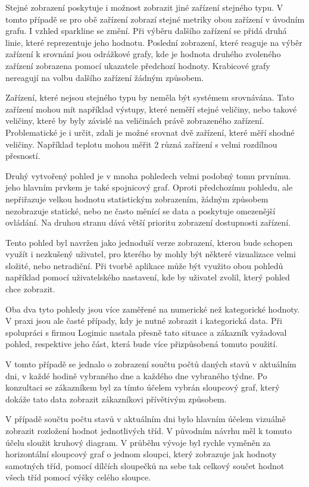 Stejné zobrazení poskytuje i možnost zobrazit jiné zařízení stejného typu. V tomto případě se pro obě zařízení zobrazí stejné metriky obou zařízení v úvodním grafu. I vzhled sparkline se změní. Při výběru dalšího zařízení se přidá druhá linie, které reprezentuje jeho hodnotu. Poslední zobrazení, které reaguje na výběr zařízení k srovnání jsou odrážkové grafy, kde je hodnota druhého zvoleného zařízení zobrazena pomocí ukazatele předchozí hodnoty. Krabicové grafy nereagují na volbu dalšího zařízení žádným způsobem.

Zařízení, které nejsou stejného typu by neměla být systémem srovnávána. Tato zařízení mohou mít například výstupy, které neměří stejné veličiny, nebo takové veličiny, které by byly závislé na veličinách právě zobrazeného zařízení. Problematické je i určit, zdali je možné srovnat dvě zařízení, které měří shodné veličiny. Například teplotu mohou měřit 2 různá zařízení s velmi rozdílnou přesností. 

Druhý vytvořený pohled je v mnoha pohledech velmi podobný tomu prvnímu. jeho hlavním prvkem je také spojnicový graf. Oproti předchozímu pohledu, ale nepřiřazuje velkou hodnotu statistickým zobrazením, žádným způsobem nezobrazuje statické, nebo ne často měnící se data a poskytuje omezenější ovládání. Na druhou stranu dává větší prioritu zobrazení dostupnosti zařízení.

Tento pohled byl navržen jako jednoduší verze zobrazení, kterou bude schopen využít i nezkušený uživatel, pro kterého by mohly být některé vizualizace velmi složité, nebo netradiční. Při tvorbě aplikace může být využito obou pohledů například pomocí uživatelského nastavení, kde by uživatel zvolil, který pohled chce zobrazit.

Oba dva tyto pohledy jsou více zaměřené na numerické než kategorické hodnoty. V praxi jsou ale časté případy, kdy je nutné zobrazit i kategorická data. Při spolupráci s firmou Logimic nastala přesně tato situace a zákazník vyžadoval pohled, respektive jeho část, která bude více přizpůsobená tomuto použití. 

V tomto případě se jednalo o zobrazení součtu počtů daných stavů v aktuálním dni, v každé hodině vybraného dne a každého dne vybraného týdne. Po konzultaci se zákazníkem byl za tímto účelem vybrán sloupcový graf, který dokáže tato data zobrazit zákazníkovi přívětivým způsobem. 

V případě součtu počtu stavů v aktuálním dni bylo hlavním účelem vizuálně zobrazit rozložení hodnot jednotlivých tříd. V původním návrhu měl k tomuto účelu sloužit kruhový diagram. V průběhu vývoje byl rychle vyměněn za horizontální sloupcový graf o jednom sloupci, který zobrazuje jak hodnoty samotných tříd, pomocí  dílčích sloupečků na sebe tak celkový součet hodnot všech tříd pomocí výšky celého sloupce. 

